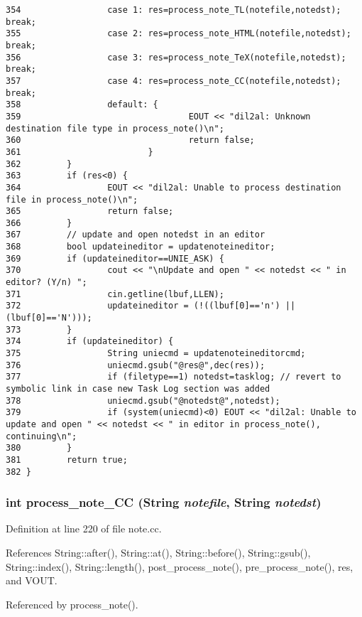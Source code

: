 \begin{verbatim}
354                 case 1: res=process_note_TL(notefile,notedst); break;
355                 case 2: res=process_note_HTML(notefile,notedst); break;
356                 case 3: res=process_note_TeX(notefile,notedst); break;
357                 case 4: res=process_note_CC(notefile,notedst); break;
358                 default: {
359                                 EOUT << "dil2al: Unknown destination file type in process_note()\n";
360                                 return false;
361                         }
362         }
363         if (res<0) {
364                 EOUT << "dil2al: Unable to process destination file in process_note()\n";
365                 return false;
366         }
367         // update and open notedst in an editor
368         bool updateineditor = updatenoteineditor;
369         if (updateineditor==UNIE_ASK) {
370                 cout << "\nUpdate and open " << notedst << " in editor? (Y/n) ";
371                 cin.getline(lbuf,LLEN);
372                 updateineditor = (!((lbuf[0]=='n') || (lbuf[0]=='N')));
373         }
374         if (updateineditor) {
375                 String uniecmd = updatenoteineditorcmd;
376                 uniecmd.gsub("@res@",dec(res));
377                 if (filetype==1) notedst=tasklog; // revert to symbolic link in case new Task Log section was added
378                 uniecmd.gsub("@notedst@",notedst);
379                 if (system(uniecmd)<0) EOUT << "dil2al: Unable to update and open " << notedst << " in editor in process_note(), continuing\n";
380         }
381         return true;
382 }
\end{verbatim}\normalsize 
{}
\subsubsection{\setlength{\rightskip}{0pt plus 5cm}int process\_\-note\_\-CC ({\bf String} {\em notefile}, {\bf String} {\em notedst})}\label{dil2al_8hh_a335}




Definition at line 220 of file note.cc.

References String::after(), String::at(), String::before(), String::gsub(), String::index(), String::length(), post\_\-process\_\-note(), pre\_\-process\_\-note(), res, and VOUT.

Referenced by process\_\-note().



